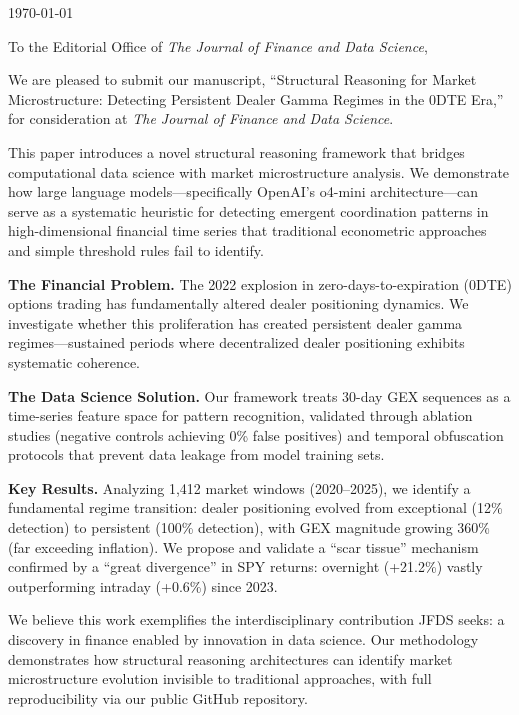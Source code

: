 \documentclass[12pt]{article}
\begin{document}
\noindent
\today

\vspace{1cm}

\noindent
To the Editorial Office of \textit{The Journal of Finance and Data Science},

\vspace{0.5cm}

We are pleased to submit our manuscript, ``Structural Reasoning for Market Microstructure: Detecting Persistent Dealer Gamma Regimes in the 0DTE Era,'' for consideration at \textit{The Journal of Finance and Data Science}.

This paper introduces a novel structural reasoning framework that bridges computational data science with market microstructure analysis. We demonstrate how large language models---specifically OpenAI's o4-mini architecture---can serve as a systematic heuristic for detecting emergent coordination patterns in high-dimensional financial time series that traditional econometric approaches and simple threshold rules fail to identify.

\textbf{The Financial Problem.} The 2022 explosion in zero-days-to-expiration (0DTE) options trading has fundamentally altered dealer positioning dynamics. We investigate whether this proliferation has created persistent dealer gamma regimes---sustained periods where decentralized dealer positioning exhibits systematic coherence.

\textbf{The Data Science Solution.} Our framework treats 30-day GEX sequences as a time-series feature space for pattern recognition, validated through ablation studies (negative controls achieving 0\% false positives) and temporal obfuscation protocols that prevent data leakage from model training sets.

\textbf{Key Results.} Analyzing 1,412 market windows (2020--2025), we identify a fundamental regime transition: dealer positioning evolved from exceptional (12\% detection) to persistent (100\% detection), with GEX magnitude growing 360\% (far exceeding inflation). We propose and validate a ``scar tissue'' mechanism confirmed by a ``great divergence'' in SPY returns: overnight (+21.2\%) vastly outperforming intraday (+0.6\%) since 2023.

We believe this work exemplifies the interdisciplinary contribution JFDS seeks: a discovery in finance enabled by innovation in data science. Our methodology demonstrates how structural reasoning architectures can identify market microstructure evolution invisible to traditional approaches, with full reproducibility via our public GitHub repository.
\end{document}
